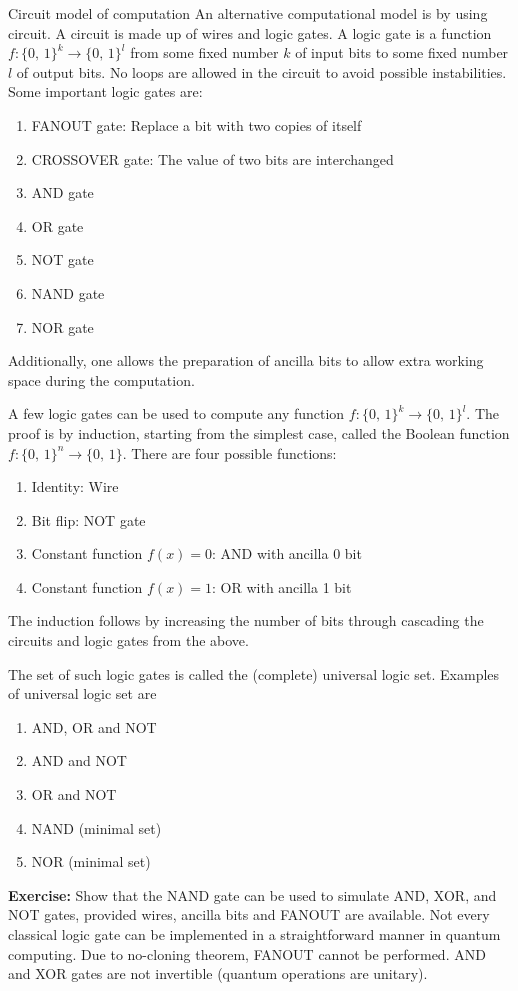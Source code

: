 \documentclass{beamer}
\begin{document}
\begin{frame}{Circuit model of computation}
\justify
An alternative computational model is by using circuit.
\vfill
A circuit is made up of wires and logic gates.
\vfill
A logic gate is a function $f:\{0,\,1\}^k \rightarrow \{0,\,1\}^l$ from some fixed number $k$ of input bits to some fixed number $l$ of output bits.
\vfill
No loops are allowed in the circuit to avoid possible instabilities.
\vfill
Some important logic gates are:
\begin{enumerate}
\item FANOUT gate: Replace a bit with two copies of itself
\item CROSSOVER gate: The value of two bits are interchanged
\item AND gate
\item OR gate
\item NOT gate
\item NAND gate
\item NOR gate
\end{enumerate}
\vfill
Additionally, one allows the preparation of ancilla bits to allow extra working space during the computation.
\end{frame}

\begin{frame}
\justify
A few logic gates can be used to compute any function $f:\{0,\,1\}^k \rightarrow \{0,\,1\}^l$.
\vfill
The proof is by induction, starting from the simplest case, called the Boolean function $f:\{0,\,1\}^n \rightarrow \{0,\,1\}$.
\vfill
There are four possible functions:
\begin{enumerate}
\item Identity: Wire
\item Bit flip: NOT gate
\item Constant function $f(x) = 0$: AND with ancilla 0 bit
\item Constant function $f(x) = 1$: OR with ancilla 1 bit
\end{enumerate}
\vfill
The induction follows by increasing the number of bits through cascading the circuits and logic gates from the above.
\end{frame}

\begin{frame}
\justify
The set of such logic gates is called the (complete) universal logic set.
\vfill
Examples of universal logic set are
\begin{enumerate}
\item AND, OR and NOT
\item AND and NOT
\item OR and NOT
\item NAND (minimal set)
\item NOR (minimal set)
\end{enumerate}
\vfill
\textbf{Exercise:} Show that the NAND gate can be used to simulate AND, XOR, and NOT gates, provided wires, ancilla bits and FANOUT are available.
\vfill
Not every classical logic gate can be implemented in a straightforward manner in quantum computing. Due to no-cloning theorem, FANOUT cannot be performed. AND and XOR gates are not invertible (quantum operations are unitary).
\end{frame}
\end{document}
